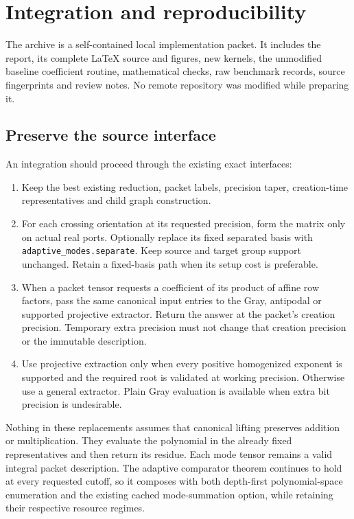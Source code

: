 \documentclass[11pt,letterpaper]{article}
\theoremstyle{definition}\newtheorem{definition}[theorem]{Definition}
\theoremstyle{remark}\newtheorem{remark}[theorem]{Remark}
\begin{document}
\section{Integration and reproducibility}
\label{sec:integration}
The archive is a self-contained local implementation packet. It includes
the report, its complete LaTeX source and figures, new kernels, the
unmodified baseline coefficient routine, mathematical checks, raw benchmark
records, source fingerprints and review notes. No remote repository was
modified while preparing it.

\subsection{Preserve the source interface}
An integration should proceed through the existing exact interfaces:
\begin{enumerate}
\item Keep the best existing reduction, packet labels, precision taper,
creation-time representatives and child graph construction.
\item For each crossing orientation at its requested precision, form the
matrix only on actual real ports. Optionally replace its fixed separated
basis with \texttt{adaptive\_modes.separate}. Keep source and target group
support unchanged. Retain a fixed-basis path when its setup cost is preferable.
\item When a packet tensor requests a coefficient of its product of affine
row factors, pass the same canonical input entries to the Gray, antipodal
or supported projective extractor. Return the answer at the packet's
creation precision. Temporary extra precision must not change that creation
precision or the immutable description.
\item Use projective extraction only when every positive homogenized
exponent is supported and the required root is validated at working
precision. Otherwise use a general extractor. Plain Gray evaluation is
available when extra bit precision is undesirable.
\end{enumerate}

Nothing in these replacements assumes that canonical lifting preserves
addition or multiplication. They evaluate the polynomial in the already
fixed representatives and then return its residue. Each mode tensor
remains a valid integral packet description. The adaptive comparator
theorem continues to hold at every requested cutoff, so it composes with
both depth-first polynomial-space enumeration and the existing cached
mode-summation option, while retaining their respective resource regimes.
\end{document}
